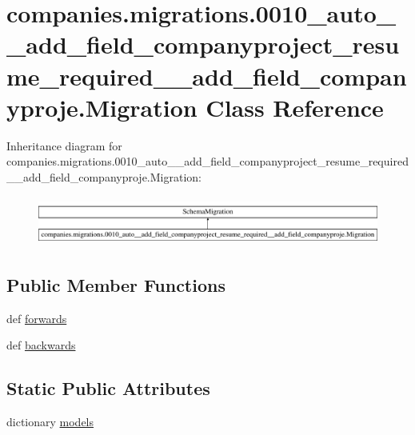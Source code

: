 \hypertarget{classcompanies_1_1migrations_1_10010__auto____add__field__companyproject__resume__required____ad54079406128046e412e93b8ceaae2c1d}{\section{companies.\-migrations.0010\-\_\-auto\-\_\-\-\_\-add\-\_\-field\-\_\-companyproject\-\_\-resume\-\_\-required\-\_\-\-\_\-add\-\_\-field\-\_\-companyproje.Migration Class Reference}
\label{classcompanies_1_1migrations_1_10010__auto____add__field__companyproject__resume__required____ad54079406128046e412e93b8ceaae2c1d}
}
Inheritance diagram for companies.\-migrations.0010\-\_\-auto\-\_\-\-\_\-add\-\_\-field\-\_\-companyproject\-\_\-resume\-\_\-required\-\_\-\-\_\-add\-\_\-field\-\_\-companyproje.Migration\-:\begin{figure}[H]
\begin{center}
\leavevmode
\includegraphics[height=1.649485cm]{classcompanies_1_1migrations_1_10010__auto____add__field__companyproject__resume__required____ad54079406128046e412e93b8ceaae2c1d}
\end{center}
\end{figure}
\subsection*{Public Member Functions}
\begin{DoxyCompactItemize}
\item 
def \hyperlink{classcompanies_1_1migrations_1_10010__auto____add__field__companyproject__resume__required____ad54079406128046e412e93b8ceaae2c1d_a0bbfbea3246bc918b9427f0212b8f44c}{forwards}
\item 
def \hyperlink{classcompanies_1_1migrations_1_10010__auto____add__field__companyproject__resume__required____ad54079406128046e412e93b8ceaae2c1d_a62e3dde2003fe6e89fc47cc1735d475f}{backwards}
\end{DoxyCompactItemize}
\subsection*{Static Public Attributes}
\begin{DoxyCompactItemize}
\item 
dictionary \hyperlink{classcompanies_1_1migrations_1_10010__auto____add__field__companyproject__resume__required____ad54079406128046e412e93b8ceaae2c1d_a265e778cd635bc099fd9663f36e05041}{models}
\end{DoxyCompactItemize}


